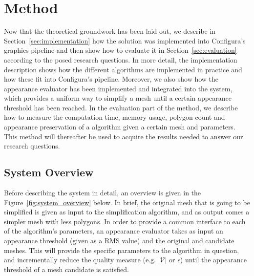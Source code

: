 
\chapter{Method} \label{cha:method}

Now that the theoretical groundwork has been laid out, we describe in Section~\ref{sec:implementation} how the solution was implemented into Configura's graphics pipeline and then show how to evaluate it in Section~\ref{sec:evaluation} according to the posed research questions. In more detail, the implementation description shows how the different algorithms are implemented in practice and how these fit into Configura's pipeline. Moreover, we also show how the appearance evaluator has been implemented and integrated into the system, which provides a uniform way to simplify a mesh until a certain appearance threshold has been reached. In the evaluation part of the method, we describe how to measure the computation time, memory usage, polygon count and appearance preservation of a algorithm given a certain mesh and parameters. This method will thereafter be used to acquire the results needed to answer our research questions.

\section{System Overview} \label{sec:system_overview}

Before describing the system in detail, an overview is given in the Figure~\ref{fig:system_overview} below. In brief, the original mesh that is going to be simplified is given as input to the simplification algorithm, and as output comes a simpler mesh with less polygons. In order to provide a common interface to each of the algorithm's parameters, an appearance evaluator takes as input an appearance threshold (given as a RMS value) and the original and candidate meshes. This will provide the specific parameters to the algorithm in question, and incrementally reduce the quality measure (e.g. $|\mathcal{V}|$ or $\epsilon$) until the appearance threshold of a mesh candidate is satisfied.

